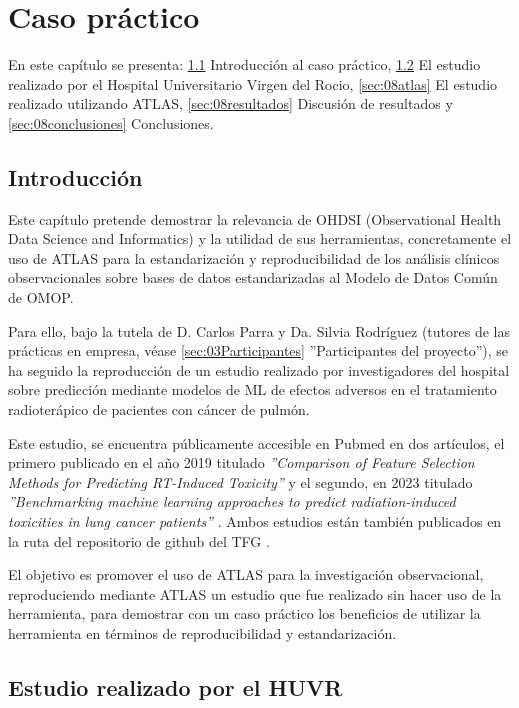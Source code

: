 \chapter{Caso práctico}\label{cap:08pruebas}
En este capítulo se presenta: \ref{sec:08intro} Introducción al caso práctico, \ref{sec:08huvr} El estudio realizado por el Hospital Universitario Virgen del Rocio, \ref{sec:08atlas} El estudio realizado utilizando ATLAS, \ref{sec:08resultados} Discusión de resultados y \ref{sec:08conclusiones} Conclusiones.

\section{Introducción} \label{sec:08intro}

Este capítulo pretende demostrar la relevancia de OHDSI (Observational Health Data Science and Informatics) y la utilidad de sus herramientas, concretamente el uso de ATLAS para la estandarización y reproducibilidad de los análisis clínicos observacionales sobre bases de datos estandarizadas al Modelo de Datos Común de OMOP. 

Para ello, bajo la tutela de D. Carlos Parra y Da. Silvia Rodríguez (tutores de las prácticas en empresa, véase \ref{sec:03Participantes} ''Participantes del proyecto''), se ha seguido la reproducción de un estudio realizado por investigadores del hospital sobre predicción mediante modelos de ML de efectos adversos en el tratamiento radioterápico de pacientes con cáncer de pulmón. 

Este estudio, se encuentra públicamente accesible en Pubmed en dos artículos, el primero publicado en el año 2019 titulado \textit{''Comparison of Feature Selection Methods for Predicting RT-Induced Toxicity'' }\cite{nunez2019comparison} y el segundo, en 2023 titulado \textit{''Benchmarking machine learning approaches to predict radiation-induced toxicities in lung cancer patients''} \cite{nunez2023benchmarking}. Ambos estudios están también publicados en la ruta  del repositorio de github del TFG \cite{vallealonsodc}.

El objetivo es promover el uso de ATLAS para la investigación observacional, reproduciendo mediante ATLAS un estudio que fue realizado sin hacer uso de la herramienta, para demostrar con un caso práctico los beneficios de utilizar la herramienta en términos de reproducibilidad y estandarización.

\section{Estudio realizado por el HUVR} \label{sec:08huvr}

